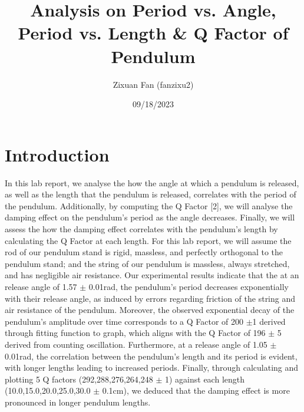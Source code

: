 \documentclass{article}
\title{Analysis on Period vs. Angle, Period vs. Length \& Q Factor of Pendulum}
\author{Zixuan Fan (fanzixu2)}
\date{09/18/2023}
\begin{document}
\maketitle

\section{Introduction}
In this lab report, we analyse the how the angle at which a pendulum is released, as well as the length that the pendulum is released, correlates with the period of the pendulum. Additionally, by computing the Q Factor [2], we will analyse the damping effect on the pendulum's period as the angle decreases. Finally, we will assess the how the damping effect correlates with the pendulum's length by calculating the Q Factor at each length. For this lab report, we will assume the rod of our pendulum stand is rigid, massless, and perfectly orthogonal to the pendulum stand; and the string of our pendulum is massless, always stretched, and has negligible air resistance. Our experimental results indicate that the at an release angle of 1.57 $\pm$ 0.01rad, the pendulum's period decreases exponentially with their release angle, as induced by errors regarding friction of the string and air resistance of the pendulum. Moreover, the observed exponential decay of the pendulum's amplitude over time corresponds to a Q Factor of 200 $\pm$1 derived through fitting function to graph, which aligns with the Q Factor of 196 $\pm$ 5 derived from counting oscillation. Furthermore, at a release angle of 1.05 $\pm$ 0.01rad, the correlation between the pendulum's length and its period is evident, with longer lengths leading to increased periods. Finally, through calculating and plotting 5 Q factors (292,288,276,264,248 $\pm$ 1) against each length (10.0,15.0,20.0,25.0,30.0 $\pm$ 0.1cm), we deduced that the damping effect is more pronounced in longer pendulum lengths. \\
\end{document}
